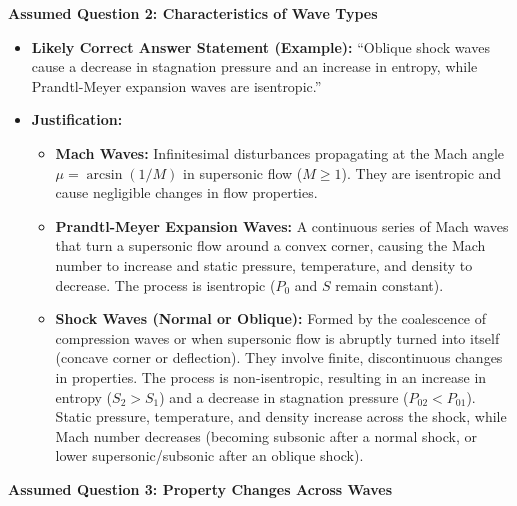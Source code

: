 \textbf{Assumed Question 2: Characteristics of Wave Types}

\begin{itemize}
\tightlist
\item
  \textbf{Likely Correct Answer Statement (Example):} ``Oblique shock
  waves cause a decrease in stagnation pressure and an increase in
  entropy, while Prandtl-Meyer expansion waves are isentropic.''
\item
  \textbf{Justification:}

  \begin{itemize}
  \tightlist
  \item
    \textbf{Mach Waves:} Infinitesimal disturbances propagating at the
    Mach angle \(\mu = \arcsin(1/M)\) in supersonic flow (\(M \ge 1\)).
    They are isentropic and cause negligible changes in flow properties.
  \item
    \textbf{Prandtl-Meyer Expansion Waves:} A continuous series of Mach
    waves that turn a supersonic flow around a convex corner, causing
    the Mach number to increase and static pressure, temperature, and
    density to decrease. The process is isentropic (\(P_0\) and \(S\)
    remain constant).
  \item
    \textbf{Shock Waves (Normal or Oblique):} Formed by the coalescence
    of compression waves or when supersonic flow is abruptly turned into
    itself (concave corner or deflection). They involve finite,
    discontinuous changes in properties. The process is non-isentropic,
    resulting in an increase in entropy (\(S_2 > S_1\)) and a decrease
    in stagnation pressure (\(P_{02} < P_{01}\)). Static pressure,
    temperature, and density increase across the shock, while Mach
    number decreases (becoming subsonic after a normal shock, or lower
    supersonic/subsonic after an oblique shock).
  \end{itemize}
\end{itemize}

\textbf{Assumed Question 3: Property Changes Across Waves}

